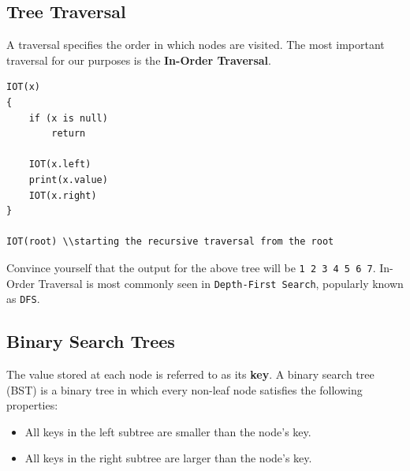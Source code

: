 \subsection{Tree Traversal}
A traversal specifies the order in which nodes are visited. The most important traversal for 
our purposes is the \textbf{In-Order Traversal}.

\begin{center}
\begin{minipage}{0.9\linewidth}
\begin{framed}
\begin{Verbatim}
IOT(x)
{
    if (x is null)
        return

    IOT(x.left)
    print(x.value)
    IOT(x.right)
}

IOT(root) \\starting the recursive traversal from the root
\end{Verbatim}
\vspace{-4mm}
\end{framed}
\end{minipage}
\end{center}

\vspace{1em}
\begin{center}
\end{center}

Convince yourself that the output for the above tree will be \texttt{1 2 3 4 5 6 7}. In-Order Traversal 
is most commonly seen in \texttt{Depth-First Search}, popularly known as \texttt{DFS}. 

\subsection{Binary Search Trees}

The value stored at each node is referred to as its \textbf{key}. A binary search tree (BST) is a 
binary tree in which every non-leaf node satisfies the following properties:
\begin{itemize}
\item All keys in the left subtree are smaller than the node's key.
\item All keys in the right subtree are larger than the node's key.
\end{itemize}

